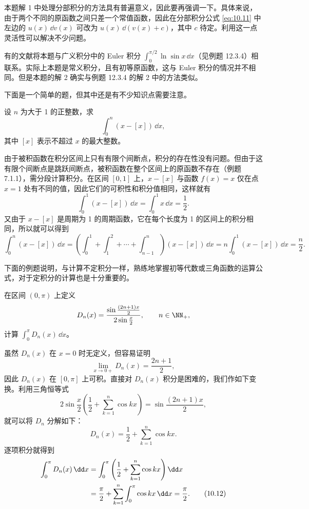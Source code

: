 \begin{xremark}
本题解 1 中处理分部积分的方法具有普遍意义，因此要再强调一下。具体来说，由于两个不同的原函数之间只差一个常值函数，因此在分部积分公式 \eqref{eq:10.11} 中左边的 $u(x)\,\dd v(x)$ 可改为 $u(x)\,\dd(v(x)+c)$，其中 $c$ 待定。利用这一点灵活性可以解决不少问题。
\end{xremark}

\begin{xremark}
有的文献将本题与广义积分中的 Euler 积分 $\int_0^{\pi/2}\ln\sin x\,\dd x$（见例题 12.3.4）相联系。实际上本题是常义积分，且有初等原函数，这与 Euler 积分的情况并不相同。但是本题的解 2 确实与例题 12.3.4 的解 2 中的方法类似。
\end{xremark}

下面是一个简单的题，但其中还是有不少知识点需要注意。

\begin{xexample}[10.4.2]
设 $n$ 为大于 1 的正整数，求
\[
  \int_0^n(x-[x])\,\dd x,
\]
其中 $[x]$ 表示不超过 $x$ 的最大整数。
\end{xexample}
\begin{xsolution}
由于被积函数在积分区间上只有有限个间断点，积分的存在性没有问题。但由于这有限个间断点是跳跃间断点，被积函数在整个区间上的原函数不存在（例题 7.1.1），需分段计算积分。在区间 $[0,1]$ 上，$x-[x]$ 与函数 $f(x)=x$ 仅在点 $x=1$ 处有不同的值，因此它们的可积性和积分值相同，这样就有
\[
  \int_0^1(x-[x])\,\dd x=\int_0^1x\,\dd x=\frac12.
\]
又由于 $x-[x]$ 是周期为 1 的周期函数，它在每个长度为 1 的区间上的积分相同，所以就可以得到
\[
  \int_0^n(x-[x])\,\dd x
  =\left(\int_0^1+\int_1^2+\cdots+\int_{n-1}^n\right)(x-[x])\,\dd x
  =n\int_0^1(x-[x])\,\dd x=\frac n2.
\]
\end{xsolution}

下面的例题说明，与计算不定积分一样，熟练地掌握初等代数或三角函数的运算公式，对于定积分的计算也是十分重要的。

\begin{xexample}[10.4.3]
在区间 $(0,\pi)$ 上定义
\[
  D_n(x)=\frac{\sin\frac{(2n+1)x}{2}}{2\sin\frac x2},\qquad n\in\NN_+,
\]
计算 $\int_0^\pi D_n(x)\,\dd x$。
\end{xexample}
\begin{xsolution}
虽然 $D_n(x)$ 在 $x=0$ 时无定义，但容易证明
\[
  \lim_{x\to0+}D_n(x)=\frac{2n+1}{2},
\]
因此 $D_n(x)$ 在 $[0,\pi]$ 上可积。直接对 $D_n(x)$ 积分是困难的，我们作如下变换。利用三角恒等式
\[
  2\sin\frac x2\left(\frac12+\sum_{k=1}^n\cos kx\right)
  =\sin\frac{(2n+1)x}{2},
\]
就可以将 $D_n$ 分解如下：
\[
  D_n(x)=\frac12+\sum_{k=1}^n\cos kx.
\]
逐项积分就得到
\begin{align}
  \int_0^\pi D_n(x)\,\dd x
  &=\int_0^\pi\left(\frac12+\sum_{k=1}^n\cos kx\right)\dd x \notag\\
  &=\frac\pi2+\sum_{k=1}^n\int_0^\pi\cos kx\,\dd x=\frac\pi2.
  \tag{10.12}
  \label{eq:10.12}
\end{align}
\end{xsolution}

